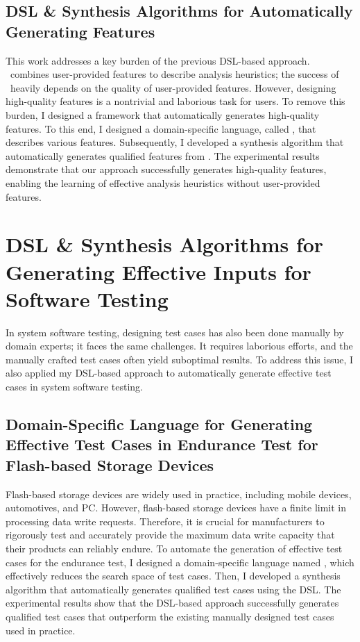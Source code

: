 \documentclass[11pt]{article}
\begin{document}
\subsection{DSL \& Synthesis Algorithms for Automatically Generating Features~\cite{Jeon20}}
%
This work addresses a key burden of the previous DSL-based approach. 
%
\DisjunctiveModel~combines user-provided features to describe analysis heuristics; the success of \DisjunctiveModel~heavily depends on the quality of user-provided features.
%
However, designing high-quality features is a nontrivial and laborious task for users.
%
To remove this burden, I designed a framework that automatically generates high-quality features.
%
To this end, I designed a domain-specific language, called \FeatureLanguage, that describes various features.
%
Subsequently, I developed a synthesis algorithm that automatically generates qualified features from \FeatureLanguage.
%
The experimental results demonstrate that our approach successfully generates high-quality features, enabling the learning of effective analysis heuristics without user-provided features.




\section{DSL \& Synthesis Algorithms for Generating Effective Inputs for Software Testing}
%
In system software testing, designing test cases has also been done manually by domain experts; it faces the same challenges.
It requires laborious efforts, and the manually crafted test cases often yield suboptimal results.
%
To address this issue, I also applied my DSL-based approach to automatically generate effective test cases in system software testing.




\subsection{Domain-Specific Language for Generating Effective Test Cases in Endurance Test for Flash-based Storage Devices~\cite{ARES23}}

Flash-based storage devices are widely used in practice, including mobile devices, automotives, and PC. 
%
However, flash-based storage devices have a finite limit in processing data write requests.
%
Therefore, it is crucial for manufacturers to rigorously test and accurately provide the maximum data write capacity that their products can reliably endure.
%
To automate the generation of effective test cases for the endurance test, I designed a domain-specific language named \AbstractRelativeWritePattern, which effectively reduces the search space of test cases.
%
Then, I developed a synthesis algorithm that automatically generates qualified test cases using the DSL.
%
The experimental results show that the DSL-based approach successfully generates qualified test cases that outperform the existing manually designed test cases used in practice.
\end{document}

